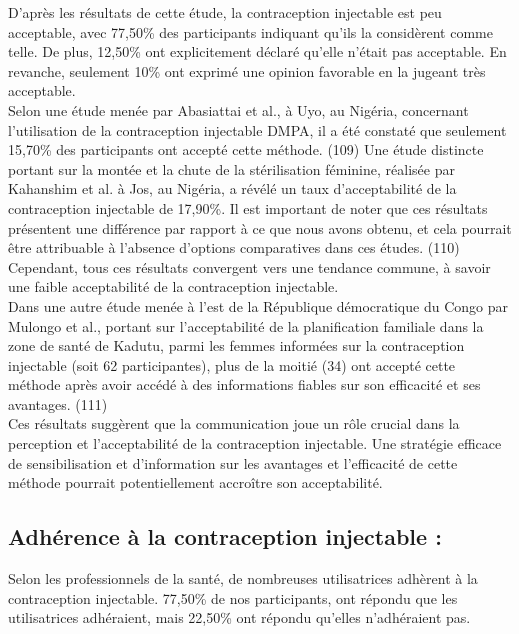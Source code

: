 D'après les résultats de cette étude, la contraception injectable est peu acceptable, avec 77,50\% des participants indiquant qu'ils la considèrent comme telle. De plus, 12,50\% ont explicitement déclaré qu'elle n'était pas acceptable. En revanche, seulement 10\% ont exprimé une opinion favorable en la jugeant très acceptable.\\

\noindent Selon une étude menée par Abasiattai et al., à Uyo, au Nigéria, concernant l'utilisation de la contraception injectable DMPA, il a été constaté que seulement 15,70\% des participants ont accepté cette méthode. (109) Une étude distincte portant sur la montée et la chute de la stérilisation féminine, réalisée par Kahanshim et al. à Jos, au Nigéria, a révélé un taux d'acceptabilité de la contraception injectable de 17,90\%. Il est important de noter que ces résultats présentent une différence par rapport à ce que nous avons obtenu, et cela pourrait être attribuable à l'absence d'options comparatives dans ces études. (110) Cependant, tous ces résultats convergent vers une tendance commune, à savoir une faible acceptabilité de la contraception injectable.\\

\noindent Dans une autre étude menée à l'est de la République démocratique du Congo par Mulongo et al., portant sur l'acceptabilité de la planification familiale dans la zone de santé de Kadutu, parmi les femmes informées sur la contraception injectable (soit 62 participantes), plus de la moitié (34) ont accepté cette méthode après avoir accédé à des informations fiables sur son efficacité et ses avantages. (111)  \\

\noindent Ces résultats suggèrent que la communication joue un rôle crucial dans la perception et l'acceptabilité de la contraception injectable. Une stratégie efficace de sensibilisation et d'information sur les avantages et l'efficacité de cette méthode pourrait potentiellement accroître son acceptabilité. 

\subsection{Adhérence à la contraception injectable : }

Selon les professionnels de la santé, de nombreuses utilisatrices adhèrent à la contraception injectable. 77,50\% de nos participants, ont répondu que les utilisatrices adhéraient, mais 22,50\% ont répondu qu’elles n’adhéraient pas. \\

